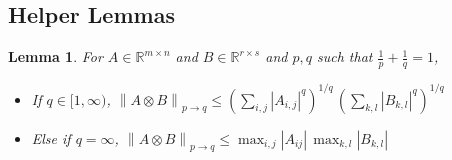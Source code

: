 \documentclass{article}
\newtheorem{lemma}{Lemma}
\newcommand{\norm}[1]{\left\|#1 \right\|}
\begin{document}
\subsection{Helper Lemmas}
\label{app:example-helper}

\begin{lemma}
For $A \in \mathbb{R}^{m \times n}$ and $B \in \mathbb{R}^{r \times s}$ and $p, q$ such that $\frac{1}{p} + \frac{1}{q} = 1$,
\begin{itemize}
    \item If $q \in [1,\infty)$, $\norm{A \otimes B}_{p \to q} \leq \left(\sum_{i,j} |A_{i,j}|^{q} \right)^{1/q}  \, \left(\sum_{k,l} |B_{k,l}|^{q} \right)^{1/q}$

    \item Else if $q = \infty$, $\norm{A \otimes B}_{p \to q} \leq \max_{i,j }|A_{ij}| \, \max_{k,l} |B_{k,l}|$
\end{itemize}
\label{lemma:krondecomp}
\end{lemma}
\end{document}
